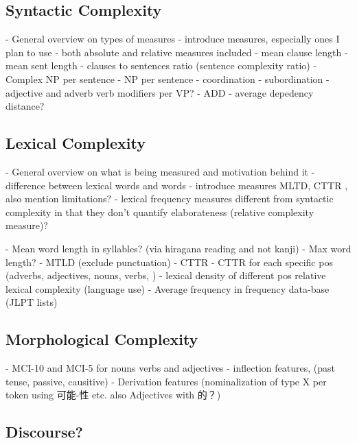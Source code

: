 
\subsection{Syntactic Complexity}
- General overview on types of measures
- introduce measures, especially ones I plan to use
- both absolute and relative measures included
    - mean clause length
    - mean sent length
    - clauses to sentences ratio (sentence complexity ratio)
    - Complex NP per sentence
    - NP per sentence
    - coordination
    - subordination
    - adjective and adverb verb modifiers per VP?
    - ADD - average depedency distance?



\subsection{Lexical Complexity}
- General overview on what is being measured and motivation behind it
    -difference between lexical words and words
- introduce measures MLTD, CTTR , also mention limitations?
- lexical frequency measures different from syntactic complexity in that they don't quantify elaborateness (relative
complexity measure)?

    - Mean word length in syllables? (via hiragana reading and not kanji)
    - Max word length?
    - MTLD (exclude punctuation)
    - CTTR
    - CTTR for each specific pos (adverbs, adjectives, nouns, verbs, )
    - lexical density of different pos
relative lexical complexity (language use)
    - Average frequency in frequency data-base (JLPT lists)

\subsection{Morphological Complexity}
    - MCI-10 and MCI-5 for nouns verbs and adjectives
    - inflection features, (past tense, passive, causitive)
    - Derivation features (nominalization of type X per token using 可能-性 etc. also Adjectives with 的？)

\subsection{Discourse?}

